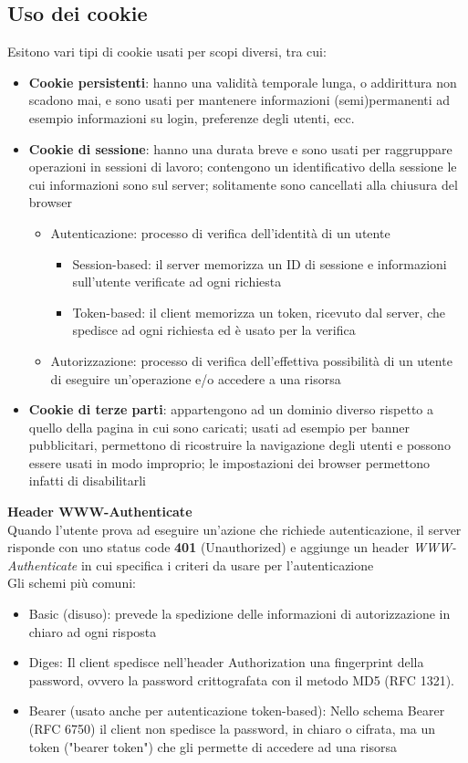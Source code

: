 \documentclass[a4paper,12pt]{article}
\begin{document}
\subsection*{Uso dei cookie}
Esitono vari tipi di cookie usati per scopi diversi, tra cui:
\begin{itemize}
  \item \textbf{Cookie persistenti}: hanno una validità temporale lunga, o addirittura non scadono mai, e sono usati per mantenere informazioni (semi)permanenti ad esempio informazioni su login, preferenze degli utenti, ecc.
  \item \textbf{Cookie di sessione}: hanno una durata breve e sono usati per raggruppare operazioni in sessioni di lavoro; contengono un identificativo della sessione le cui informazioni sono sul server; solitamente sono cancellati alla chiusura del browser
  \begin{itemize}
    \item Autenticazione: processo di verifica dell'identità di un utente
    \begin{itemize}
      \item Session-based: il server memorizza un ID di sessione e informazioni sull'utente verificate ad ogni richiesta
      \item Token-based: il client memorizza un token, ricevuto dal server, che spedisce ad ogni richiesta ed è usato per la verifica
    \end{itemize}
    \item Autorizzazione: processo di verifica dell'effettiva possibilità di un utente di eseguire un'operazione e/o accedere a una risorsa
  \end{itemize}
  \item \textbf{Cookie di terze parti}: appartengono ad un dominio diverso rispetto a quello della pagina in cui sono caricati; usati ad esempio per banner pubblicitari, permettono di ricostruire la navigazione degli utenti e possono essere usati in modo improprio; le impostazioni dei browser permettono infatti di disabilitarli
\end{itemize}
\textbf{Header WWW-Authenticate} \\
Quando l'utente prova ad eseguire un'azione che richiede autenticazione, il server risponde con uno status code \textbf{401} (Unauthorized) e aggiunge un header \textit{WWW-Authenticate} in cui specifica i criteri da usare per l'autenticazione \\
Gli schemi più comuni:
\begin{itemize}
  \item Basic (disuso): prevede la spedizione delle informazioni di autorizzazione in chiaro ad ogni risposta
  \item Diges: Il client spedisce nell'header Authorization una fingerprint della password, ovvero la password crittografata con il metodo MD5 (RFC 1321).
  \item Bearer (usato anche per autenticazione token-based): Nello schema Bearer (RFC 6750) il client non spedisce la password, in chiaro o cifrata, ma un token ("bearer token") che gli permette di accedere ad una risorsa
\end{itemize}
\end{document}
